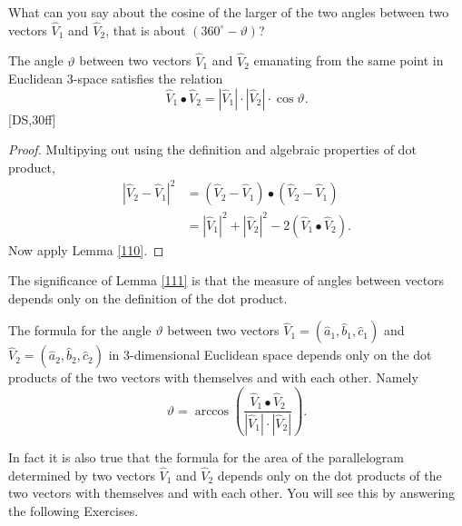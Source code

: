 \begin{exercise}
What can you say about the cosine of the larger of the two angles between two
vectors $\hat{V}_{1}$ and $\hat{V}_{2}$, that is about $\left(  360^{\circ
}-\vartheta\right)  $?
\end{exercise}

\begin{lemma}
\label{111}The angle $\vartheta$ between two vectors $\hat{V}_{1}$ and
$\hat{V}_{2}$ emanating from the same point in Euclidean $3$-space satisfies
the relation
\begin{equation}
\hat{V}_{1}\bullet\hat{V}_{2}=\left\vert \hat{V}_{1}\right\vert \cdot
\left\vert \hat{V}_{2}\right\vert \cdot\cos\vartheta. \label{2}%
\end{equation}
[DS,30ff]
\end{lemma}

\begin{proof}
Multipying out using the definition and algebraic properties of dot product,%
\begin{align*}
\left\vert \hat{V}_{2}-\hat{V}_{1}\right\vert ^{2}  &  =\left(  \hat{V}%
_{2}-\hat{V}_{1}\right)  \bullet\left(  \hat{V}_{2}-\hat{V}_{1}\right) \\
&  =\left\vert \hat{V}_{1}\right\vert ^{2}+\left\vert \hat{V}_{2}\right\vert
^{2}-2\left(  \hat{V}_{1}\bullet\hat{V}_{2}\right)  .
\end{align*}
Now apply Lemma \ref{110}.
\end{proof}

The significance of Lemma \ref{111} is that the measure of angles between
vectors depends only on the definition of the dot product.

\begin{corollary}
The formula for the angle $\vartheta$ between two vectors $\hat{V}_{1}=\left(
\hat{a}_{1},\hat{b}_{1},\hat{c}_{1}\right)  $ and $\hat{V}_{2}=\left(  \hat
{a}_{2},\hat{b}_{2},\hat{c}_{2}\right)  $ in $3$-dimensional Euclidean space
depends only on the dot products of the two vectors with themselves and with
each other. Namely%
\[
\vartheta=\arccos\left(  \frac{\hat{V}_{1}\bullet\hat{V}_{2}%
}{\left\vert \hat{V}_{1}\right\vert \cdot\left\vert \hat{V}_{2}\right\vert
}\right)  .
\]

\end{corollary}

In fact it is also true that the formula for the area of the parallelogram
determined by two vectors $\hat{V}_{1}$ and $\hat{V}_{2}$ depends only on the
dot products of the two vectors with themselves and with each other. You will
see this by answering the following Exercises.


